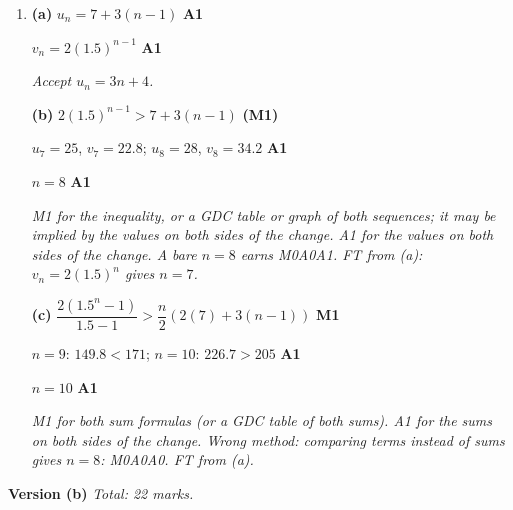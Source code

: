 \documentclass[12pt, twoside]{article}
\begin{document}
\begin{enumerate}[itemsep=0.3cm]
$3^{x} = \dfrac{1}{3} \Rightarrow x = -1$ \hfill \textbf{A1}

$3^{x} = 27 \Rightarrow x = 3$ \hfill \textbf{A1}

\emph{M1 for the quadratic in $u$. (M1) for an attempt at any method of
solving their quadratic (factorizing, the formula, completing the square or
the GDC); it may be implied by a correct value of $u$. A1 for either
$u = \frac{1}{3}$ or $u = 27$ correct. Stopping at $u = \frac{1}{3}, 27$
earns M1(M1)A1A0A0. Wrong method: reading $3^{x}$ as $3x$ gives
$x = \frac{1}{9}, 9$: A0A0 for those values.}

\newpage

\item[2.] [Maximum mark: 8]

\textbf{(a)} $u_{n} = 7 + 3(n - 1)$ \hfill \textbf{A1}

$v_{n} = 2(1.5)^{n - 1}$ \hfill \textbf{A1}

\emph{Accept $u_{n} = 3n + 4$.}

\textbf{(b)} $2(1.5)^{n - 1} > 7 + 3(n - 1)$ \hfill \textbf{(M1)}

$u_{7} = 25$, $v_{7} = 22.8$; \quad $u_{8} = 28$, $v_{8} = 34.2$ \hfill \textbf{A1}

$n = 8$ \hfill \textbf{A1}

\emph{M1 for the inequality, or a GDC table or graph of both sequences; it
may be implied by the values on both sides of the change. A1
for the values on both sides of the change. A bare $n = 8$ earns M0A0A1. FT from (a): $v_{n} = 2(1.5)^{n}$
gives $n = 7$.}

\textbf{(c)} $\dfrac{2\left(1.5^{n} - 1\right)}{1.5 - 1} > \dfrac{n}{2}\left(2(7) + 3(n - 1)\right)$ \hfill \textbf{M1}

$n = 9$: $149.8 < 171$; \quad $n = 10$: $226.7 > 205$ \hfill \textbf{A1}

$n = 10$ \hfill \textbf{A1}

\emph{M1 for both sum formulas (or a GDC table of both sums). A1 for the
sums on both sides of the change. Wrong method: comparing terms instead of
sums gives $n = 8$: M0A0A0. FT from (a).}

\end{enumerate}

\newpage

\textbf{\large Version (b)} \hfill \emph{Total: 22 marks.}
\end{document}
